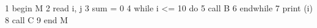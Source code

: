  1 begin M
 2   read i, j
 3   sum = 0
 4   while i <= 10 do
 5     call B
 6   endwhile
 7   print (i)
 8   call C
 9 end M
